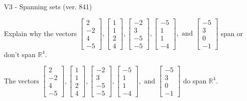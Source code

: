 \begin{exercise}
  \begin{exerciseTitle}V3 - Spanning sets (ver. 841)\end{exerciseTitle}
  \begin{exerciseStatement}
    Explain why the vectors \(\left[\begin{array}{r}
2 \\
-2 \\
4 \\
-5
\end{array}\right] , \left[\begin{array}{r}
1 \\
1 \\
2 \\
4
\end{array}\right] , \left[\begin{array}{r}
-2 \\
3 \\
-5 \\
-5
\end{array}\right] , \left[\begin{array}{r}
-5 \\
1 \\
1 \\
-4
\end{array}\right] , \text{ and } \left[\begin{array}{r}
-5 \\
3 \\
0 \\
-1
\end{array}\right]\) span or don't span \(\mathbb{R}^4\). 
	


  \end{exerciseStatement}
  \begin{exerciseAnswer}
   The vectors \(\left[\begin{array}{r}
2 \\
-2 \\
4 \\
-5
\end{array}\right] , \left[\begin{array}{r}
1 \\
1 \\
2 \\
4
\end{array}\right] , \left[\begin{array}{r}
-2 \\
3 \\
-5 \\
-5
\end{array}\right] , \left[\begin{array}{r}
-5 \\
1 \\
1 \\
-4
\end{array}\right] , \text{ and } \left[\begin{array}{r}
-5 \\
3 \\
0 \\
-1
\end{array}\right]\) 
  	 do  
	span \(\mathbb{R}^4\).
  



\end{exerciseAnswer}
\end{exercise}
